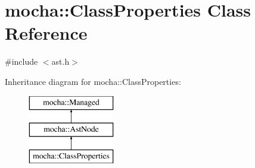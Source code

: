 \hypertarget{classmocha_1_1_class_properties}{
\section{mocha::ClassProperties Class Reference}
\label{classmocha_1_1_class_properties}
}


{\ttfamily \#include $<$ast.h$>$}

Inheritance diagram for mocha::ClassProperties:\begin{figure}[H]
\begin{center}
\leavevmode
\includegraphics[height=3.000000cm]{classmocha_1_1_class_properties}
\end{center}
\end{figure}

